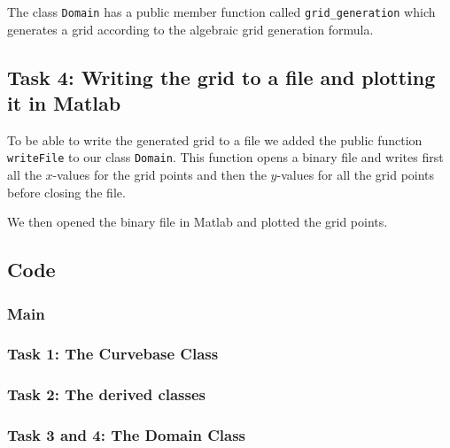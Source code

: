 \documentclass[a4paper,10pt]{article}
\begin{document}
The class \texttt{Domain} has a public member function called \texttt{grid\_generation} which generates a grid according to the algebraic grid generation formula.

\subsection*{Task 4: Writing the grid to a file and plotting it in Matlab}
To be able to write the generated grid to a file we added the public function \texttt{writeFile} to our class \texttt{Domain}. This function opens a binary file and writes first all the $x$-values for the grid points and then the $y$-values for all the grid points before closing the file. 

We then opened the binary file in Matlab and plotted the grid points. 


\newpage
\subsection*{Code}
\subsubsection*{Main}

\subsubsection*{Task 1: The Curvebase Class}


\subsubsection*{Task 2: The derived classes}






\subsubsection*{Task 3 and 4: The Domain Class}


\end{document}

